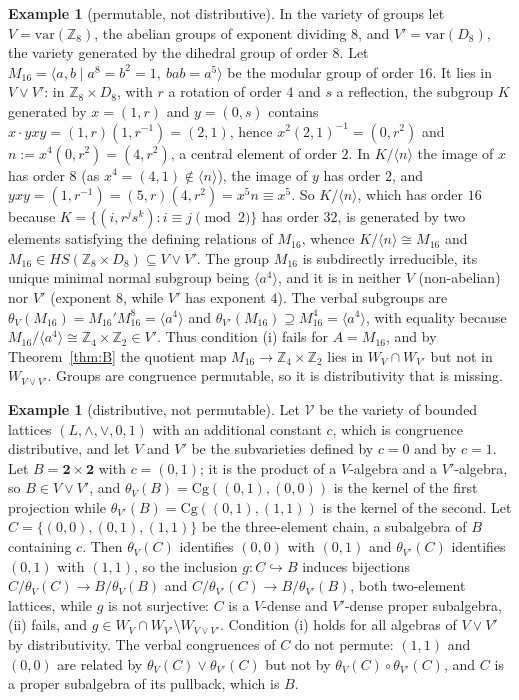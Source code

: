 \documentclass[11pt]{amsart}
\theoremstyle{definition}
\newtheorem{ex}[thm]{Example}
\newcommand{\Cg}{\mathrm{Cg}}
\newcommand{\sV}{\mathcal V}
\newcommand{\var}{\mathrm{var}}
\begin{document}
\begin{ex}[permutable, not distributive]\label{ex:groups}
In the variety of groups let $V=\var(\mathbb Z_8)$, the abelian groups of
exponent dividing $8$, and $V'=\var(D_8)$, the variety generated by the
dihedral group of order $8$. Let $M_{16}=\langle a,b\mid a^8=b^2=1,\
bab=a^5\rangle$ be the modular group of order $16$. It lies in $V\vee V'$: in
$\mathbb Z_8\times D_8$, with $r$ a rotation of order $4$ and $s$ a reflection,
the subgroup $K$ generated by $x=(1,r)$ and $y=(0,s)$ contains
$x\cdot yxy=(1,r)(1,r^{-1})=(2,1)$, hence $x^2(2,1)^{-1}=(0,r^2)$ and
$n:=x^4(0,r^2)=(4,r^2)$, a central element of order $2$. In $K/\langle n\rangle$
the image of $x$ has order $8$ (as $x^4=(4,1)\notin\langle n\rangle$), the image
of $y$ has order $2$, and $yxy=(1,r^{-1})=(5,r)(4,r^2)=x^5n\equiv x^5$. So
$K/\langle n\rangle$, which has order $16$ because $K=\{(i,r^js^k):i\equiv j
\pmod 2\}$ has order $32$, is generated by two elements satisfying the defining
relations of $M_{16}$, whence $K/\langle n\rangle\cong M_{16}$ and $M_{16}\in HS(\mathbb Z_8\times
D_8)\subseteq V\vee V'$. The group $M_{16}$ is subdirectly irreducible, its
unique minimal normal subgroup being $\langle a^4\rangle$, and it is in neither
$V$ (non-abelian) nor $V'$ (exponent $8$, while $V'$ has exponent $4$). The
verbal subgroups are $\theta_V(M_{16})=M_{16}'M_{16}^8=\langle a^4\rangle$ and
$\theta_{V'}(M_{16})\supseteq M_{16}^4=\langle a^4\rangle$, with equality
because $M_{16}/\langle a^4\rangle\cong\mathbb Z_4\times\mathbb Z_2\in V'$.
Thus condition (i) fails for $A=M_{16}$, and by Theorem~\ref{thm:B}
the quotient map $M_{16}\to\mathbb Z_4\times\mathbb Z_2$ lies in
$W_V\cap W_{V'}$ but not in $W_{V\vee V'}$. Groups are congruence permutable,
so it is distributivity that is missing.
\end{ex}

\begin{ex}[distributive, not permutable]\label{ex:lattices}
Let $\sV$ be the variety of bounded lattices $(L,\wedge,\vee,0,1)$ with an
additional constant $c$, which is congruence distributive, and let $V$ and $V'$
be the subvarieties defined by $c=0$ and by $c=1$. Let $B=\mathbf 2\times\mathbf 2$
with $c=(0,1)$; it is the product of a $V$-algebra and a $V'$-algebra, so
$B\in V\vee V'$, and $\theta_V(B)=\Cg((0,1),(0,0))$ is the kernel of the first
projection while $\theta_{V'}(B)=\Cg((0,1),(1,1))$ is the kernel of the second.
Let $C=\{(0,0),(0,1),(1,1)\}$ be the three-element chain, a subalgebra of $B$
containing $c$. Then $\theta_V(C)$ identifies $(0,0)$ with $(0,1)$ and
$\theta_{V'}(C)$ identifies $(0,1)$ with $(1,1)$, so the inclusion
$g\colon C\hookrightarrow B$ induces bijections $C/\theta_V(C)\to B/\theta_V(B)$
and $C/\theta_{V'}(C)\to B/\theta_{V'}(B)$, both two-element lattices, while $g$
is not surjective: $C$ is a $V$-dense and $V'$-dense proper subalgebra, (ii)
fails, and $g\in W_V\cap W_{V'}\setminus W_{V\vee V'}$. Condition (i) holds
for all algebras of $V\vee V'$ by distributivity. The verbal congruences of
$C$ do not permute: $(1,1)$ and $(0,0)$ are related by
$\theta_V(C)\vee\theta_{V'}(C)$ but not by $\theta_V(C)\circ\theta_{V'}(C)$,
and $C$ is a proper subalgebra of its pullback, which is $B$.
\end{ex}
\end{document}
